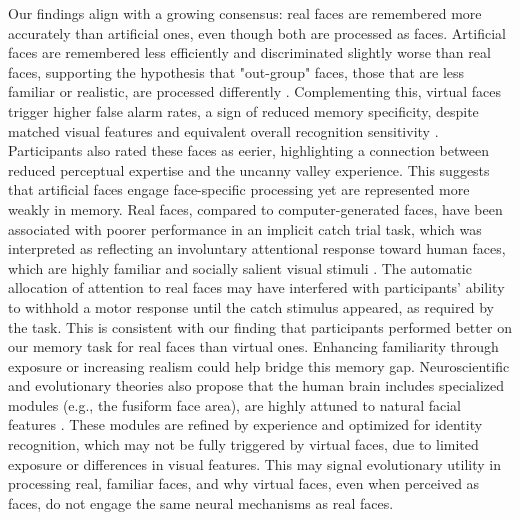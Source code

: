 Our findings align with a growing consensus: real faces are remembered more accurately than artificial ones, even though both are processed as faces. 
Artificial faces are remembered less efficiently and discriminated slightly worse than real faces, supporting the hypothesis that "out-group" faces, those that are less familiar or realistic, are processed differently \citep{balas_artificial_2015}.
Complementing this, virtual faces trigger higher false alarm rates, a sign of reduced memory specificity, despite matched visual features and equivalent overall recognition sensitivity \citep{katsyri_those_2018}. 
Participants also rated these faces as eerier, highlighting a connection between reduced perceptual expertise and the uncanny valley experience. 
This suggests that artificial faces engage face-specific processing yet are represented more weakly in memory. 
Real faces, compared to computer-generated faces, have been associated with poorer performance in an implicit catch trial task, which was interpreted as reflecting an involuntary attentional response toward human faces, which are highly familiar and socially salient visual stimuli \citep{katsyri_amygdala_2020}. 
The automatic allocation of attention to real faces may have interfered with participants' ability to withhold a motor response until the catch stimulus appeared, as required by the task. 
This is consistent with our finding that participants performed better on our memory task for real faces than virtual ones.
Enhancing familiarity through exposure \citep{park_individuals_2021} or increasing realism could help bridge this memory gap. 
Neuroscientific and evolutionary theories also propose that the human brain includes specialized modules (e.g., the fusiform face area), are highly attuned to natural facial features \citep{burke_evolution_2013}. 
These modules are refined by experience and optimized for identity recognition, which may not be fully triggered by virtual faces, due to limited exposure or differences in visual features.
This may signal evolutionary utility in processing real, familiar faces, and why virtual faces, even when perceived as faces, do not engage the same neural mechanisms as real faces.

